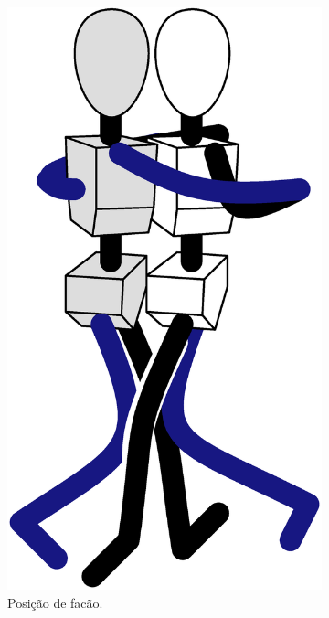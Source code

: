 \begin{figure}[!ht]
\begin{subfigure}[b]{0.205\textwidth}
         \centering
         \includegraphics[width=\textwidth]{chapters/cap-normas/position-facao.eps}
         \caption{Posição de facão.}
         \label{fig:positiongeralsamba:facao}
     \end{subfigure}
     \hfill
     \begin{subfigure}[b]{0.245\textwidth}
         \centering

\end{subfigure}
\end{figure}
